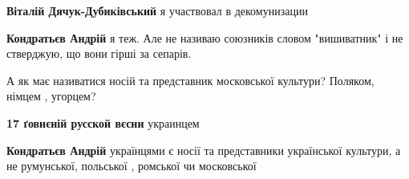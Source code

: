 \begin{itemize}
\begin{itemize}
\begin{itemize}
 
\textbf{Віталій Дячук-Дубиківський} я участвовал в декомунизации

 
\textbf{Кондратьєв Андрій} я теж. Але не називаю союзників словом "вишиватник" і не стверджую, що вони гірші за сепарів.
\end{itemize}

 

А як має називатися носій та представник московської культури? Поляком, німцем
, угорцем?

\begin{itemize}
 
\textbf{17 ґовнєній русской вєсни} украинцем

 

\textbf{Кондратьєв Андрій} українцями є носії та представники української культури, а не румунської, польської , ромської чи московської

 


\end{itemize}
\end{itemize}
\end{itemize}
